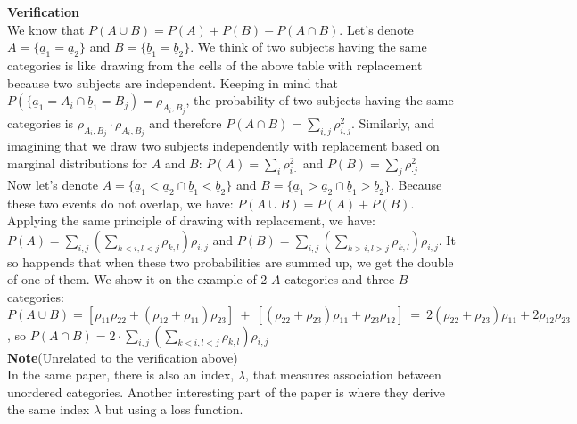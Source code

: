 \documentclass[]{article}
\begin{document}
{\scriptsize{\textbf{Verification}\\
We know that $P(A\cup B) = P(A) + P(B) - P(A\cap B)$. Let's denote $A=\{\underline{a}_1 =\underline{a}_2\}$ and  $B=\{\underline{b}_1 =\underline{b}_2\}$. We think of two subjects having the same categories is like drawing from the cells of the above table with replacement because two subjects are independent. Keeping in mind that $P(\{\underline{a}_1=A_i\cap \underline{b}_1 =B_j) =\rho_{A_i,B_j}$, the probability of two subjects having the same categories is $\rho_{A_i,B_j}\cdot \rho_{A_i,B_j}$ and therefore $P(A\cap B) = \sum_{i,j}\rho_{i,j}^2$. Similarly, and imagining that we draw two subjects independently with replacement based on marginal distributions for $A$ and $B$: $P(A) = \sum_{i}\rho_{i\cdot}^2$ and $P(B) = \sum_{j}\rho_{\cdot j}^2$
\\
Now let's denote $A=\{\underline{a}_1 <\underline{a}_2 \cap\underline{b}_1 <\underline{b}_2\}$ and  $B=\{\underline{a}_1 >\underline{a}_2 \cap \underline{b}_1 >\underline{b}_2\}$. Because these two events do not overlap, we have: $P(A\cup B) = P(A) + P(B)$. Applying the same principle of drawing with replacement, we have: $P(A) = \sum_{i,j}\left(\sum_{k<i,l<j}\rho_{k,l} \right)\rho_{i,j}$ and $P(B) = \sum_{i,j}\left(\sum_{k>i,l>j}\rho_{k,l} \right)\rho_{i,j}$. It so happends that when these two probabilities are summed up, we get the double of one of them. We show it on the example of 2 $A$ categories and three $B$ categories: $P(A\cup B) = [\rho_{11}\rho_{22} + (\rho_{12} + \rho_{11})\rho_{23}]~ + ~[(\rho_{22} + \rho_{23})\rho_{11} + \rho_{23}\rho_{12}] ~=~ 2(\rho_{22} + \rho_{23})\rho_{11} + 2\rho_{12}\rho_{23}$, so $P(A\cap B) = 2\cdot \sum_{i,j}\left(\sum_{k<i,l<j}\rho_{k,l} \right)\rho_{i,j}$
\\
\textbf{Note}(Unrelated to the verification above)\\
In the same paper, there is also an index, $\lambda$, that measures association between unordered categories. Another interesting part of the paper is where they derive the same index $\lambda$ but using a loss function.
}}\\
\end{document}

